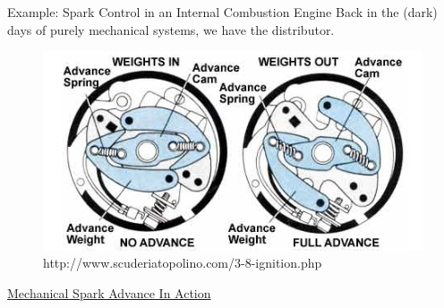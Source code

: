 \documentclass[aspectratio=169]{beamer}
\begin{document}
  
  
\begin{frame}[t]{Example: Spark Control in an Internal Combustion Engine}
Back in the (dark) days of purely mechanical systems, we have the distributor.
\begin{figure}
\includegraphics[scale=0.70]{img/3-8-ignition_clip_image005.jpg}
\caption{http://www.scuderiatopolino.com/3-8-ignition.php}
\end{figure}
\href{https://www.youtube.com/watch?v=RcmkbQVPz9E}{Mechanical Spark Advance In Action}
\end{frame}
\end{document}
